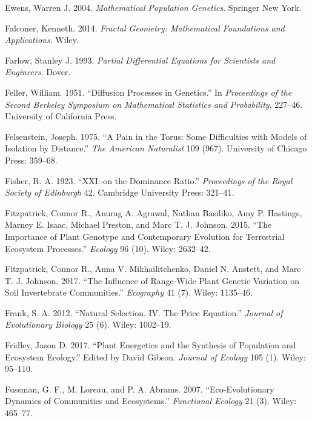 \documentclass[]{article}
\begin{document}
\leavevmode\hypertarget{ref-Ewens2004}{}%
Ewens, Warren J. 2004. \emph{Mathematical Population Genetics}. Springer
New York.

\leavevmode\hypertarget{ref-kennethfalconer2014}{}%
Falconer, Kenneth. 2014. \emph{Fractal Geometry: Mathematical
Foundations and Applications}. Wiley.

\leavevmode\hypertarget{ref-stanleyfarlow1993}{}%
Farlow, Stanley J. 1993. \emph{Partial Differential Equations for
Scientists and Engineers}. Dover.

\leavevmode\hypertarget{ref-feller1951}{}%
Feller, William. 1951. ``Diffusion Processes in Genetics.'' In
\emph{Proceedings of the Second Berkeley Symposium on Mathematical
Statistics and Probability}, 227--46. University of California Press.

\leavevmode\hypertarget{ref-Felsenstein1975}{}%
Felsenstein, Joseph. 1975. ``A Pain in the Torus: Some Difficulties with
Models of Isolation by Distance.'' \emph{The American Naturalist} 109
(967). University of Chicago Press: 359--68.

\leavevmode\hypertarget{ref-Fisher1923}{}%
Fisher, R. A. 1923. ``XXI.-on the Dominance Ratio.'' \emph{Proceedings
of the Royal Society of Edinburgh} 42. Cambridge University Press:
321--41.

\leavevmode\hypertarget{ref-Fitzpatrick2015}{}%
Fitzpatrick, Connor R., Anurag A. Agrawal, Nathan Basiliko, Amy P.
Hastings, Marney E. Isaac, Michael Preston, and Marc T. J. Johnson.
2015. ``The Importance of Plant Genotype and Contemporary Evolution for
Terrestrial Ecosystem Processes.'' \emph{Ecology} 96 (10). Wiley:
2632--42.

\leavevmode\hypertarget{ref-Fitzpatrick2017}{}%
Fitzpatrick, Connor R., Anna V. Mikhailitchenko, Daniel N. Anstett, and
Marc T. J. Johnson. 2017. ``The Influence of Range-Wide Plant Genetic
Variation on Soil Invertebrate Communities.'' \emph{Ecography} 41 (7).
Wiley: 1135--46.

\leavevmode\hypertarget{ref-FRANK2012}{}%
Frank, S. A. 2012. ``Natural Selection. IV. The Price Equation.''
\emph{Journal of Evolutionary Biology} 25 (6). Wiley: 1002--19.

\leavevmode\hypertarget{ref-Fridley2017}{}%
Fridley, Jason D. 2017. ``Plant Energetics and the Synthesis of
Population and Ecosystem Ecology.'' Edited by David Gibson.
\emph{Journal of Ecology} 105 (1). Wiley: 95--110.

\leavevmode\hypertarget{ref-FUSSMANN2007}{}%
Fussman, G. F., M. Loreau, and P. A. Abrams. 2007. ``Eco-Evolutionary
Dynamics of Communities and Ecosystems.'' \emph{Functional Ecology} 21
(3). Wiley: 465--77.
\end{document}
